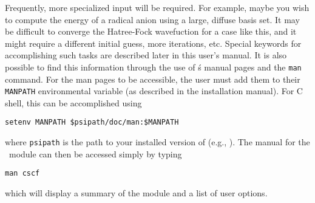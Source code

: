 Frequently, more specialized input will be required.  For example,
maybe you wish to compute the energy of a radical anion using a large,
diffuse basis set.  It may be difficult to converge the Hatree-Fock 
wavefuction for a case like this, and it might require a different
initial guess, more iterations, etc.  Special keywords for accomplishing
such tasks are described later in this user's manual.  It is also
possible to find this information through the use of \PSIthree\'s 
manual pages and the {\tt man} command.  For the man pages to be accessible,
the user must add them to their {\tt MANPATH} environmental variable (as
described in the installation manual).  For C shell, this can be 
accomplished using
\begin{verbatim}
setenv MANPATH $psipath/doc/man:$MANPATH
\end{verbatim}
where {\tt psipath} is the path to your installed version of 
\PSIthree (e.g., ).  The manual for the \PSIcscf\
module can then be accessed simply by typing
\begin{verbatim}
man cscf
\end{verbatim}
which will display a summary of the module and a list of user options.

